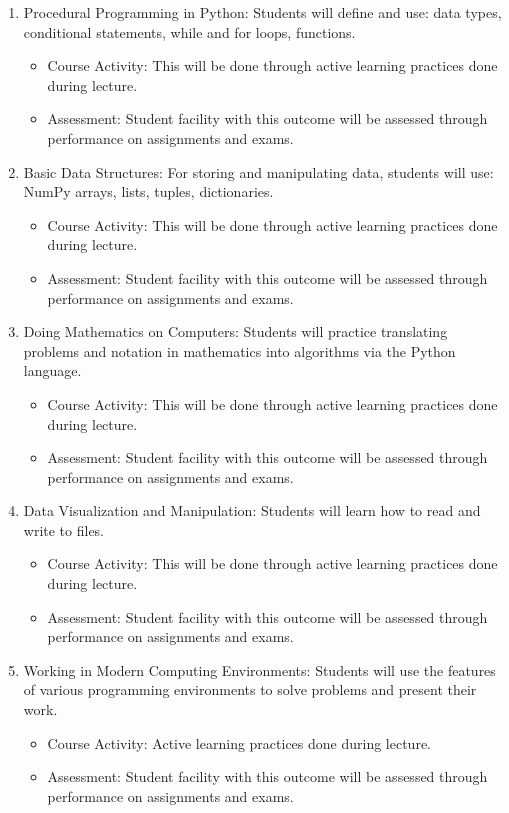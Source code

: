 \documentclass[a4paper,11pt]{article}
\begin{document}
\begin{enumerate}
\item Procedural Programming in Python: Students will define and use: data types, conditional statements, while and for loops, functions.
\begin{itemize}
\item Course Activity:  This will be done through active learning practices done during lecture.  
\item Assessment:  Student facility with this outcome will be assessed through performance on assignments and exams.  
\end{itemize}
\item Basic Data Structures: For storing and manipulating data, students will use: NumPy arrays, lists, tuples, dictionaries.
\begin{itemize}
\item Course Activity:  This will be done through active learning practices done during lecture.  
\item Assessment: Student facility with this outcome will be assessed through performance on assignments and exams.  
\end{itemize}
\item Doing Mathematics on Computers: Students will practice translating problems and notation in mathematics into algorithms via the Python language.
\begin{itemize}
\item Course Activity:  This will be done through active learning practices done during lecture.  
\item Assessment: Student facility with this outcome will be assessed through performance on assignments and exams.  
\end{itemize}  
\item Data Visualization and Manipulation: Students will learn how to read and write to files.
\begin{itemize}
\item Course Activity:  This will be done through active learning practices done during lecture.  
\item Assessment: Student facility with this outcome will be assessed through performance on assignments and exams.  
\end{itemize}  
\item Working in Modern Computing Environments: Students will use the features of various programming environments to solve problems and present their work.
\begin{itemize}
\item Course Activity: Active learning practices done during lecture.
\item Assessment: Student facility with this outcome will be assessed through performance on assignments and exams.
\end{itemize}  
\end{enumerate}   
\end{document}
